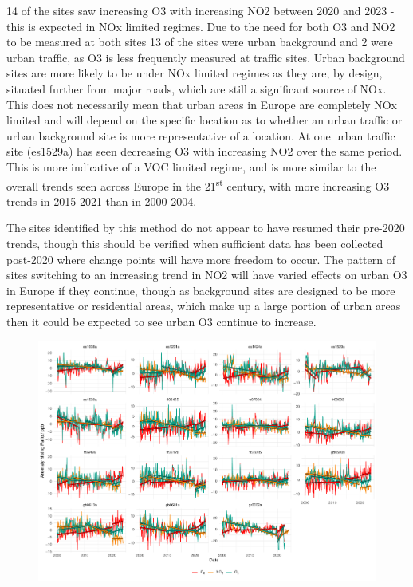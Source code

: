 \documentclass[journal abbreviation, manuscript]{copernicus}
\begin{document}
14 of the sites saw increasing O3 with increasing NO2 between 2020 and 2023 - this is expected in NOx limited regimes. Due to the need for both O3 and NO2 to be measured at both sites 13 of the sites were urban background and 2 were urban traffic, as O3 is less frequently measured at traffic sites. Urban background sites are more likely to be under NOx limited regimes as they are, by design, situated further from major roads, which are still a significant source of NOx. This does not necessarily mean that urban areas in Europe are completely NOx limited and will depend on the specific location as to whether an urban traffic or urban background site is more representative of a location. At one urban traffic site (es1529a) has seen decreasing O3 with increasing NO2 over the same period. This is more indicative of a VOC limited regime, and is more similar to the overall trends seen across Europe in the 21\textsuperscript{st} century, with more increasing O3 trends in 2015-2021 than in 2000-2004. 

The sites identified by this method do not appear to have resumed their pre-2020 trends, though this should be verified when sufficient data has been collected post-2020 where change points will have more freedom to occur. The pattern of sites switching to an increasing trend in NO2 will have varied effects on urban O3 in Europe if they continue, though as background sites are designed to be more representative or residential areas, which make up a large portion of urban areas then it could be expected to see urban O3 continue to increase. 


\begin{figure}
    \includegraphics[width=12cm]{figures/f13_2020_in_europe.pdf}
\caption{}
\label{fig:2020_in_europe}
\end{figure}
\end{document}
